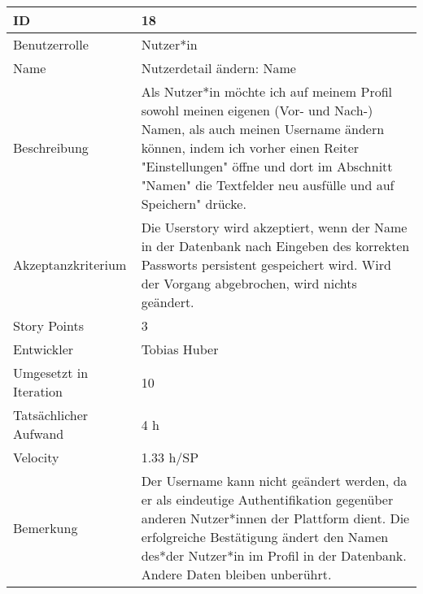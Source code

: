 \begin{tabularx}{\textwidth}{|p{}|X|}
	\hline
	ID & 18\\
	\hline
	Benutzerrolle & Nutzer*in\\
	\hline
	Name & Nutzerdetail ändern: Name\\
	\hline
	Beschreibung & Als Nutzer*in möchte ich auf meinem Profil sowohl meinen eigenen (Vor- und Nach-) Namen, als auch meinen Username ändern können, indem ich vorher einen Reiter "Einstellungen" öffne und dort im Abschnitt "Namen" die Textfelder neu ausfülle und auf Speichern" drücke.\\
	\hline
	Akzeptanzkriterium & Die Userstory wird akzeptiert, wenn der Name in der Datenbank nach Eingeben des korrekten Passworts persistent gespeichert wird. Wird der Vorgang abgebrochen, wird nichts geändert.\\
	\hline
	Story Points & 3\\
	\hline
	Entwickler & Tobias Huber\\
	\hline
	Umgesetzt in Iteration & 10\\
	\hline
	Tatsächlicher Aufwand & 4 h\\
	\hline
	Velocity & 1.33 h/SP\\
	\hline
	Bemerkung & Der Username kann nicht geändert werden, da er als eindeutige Authentifikation gegenüber anderen Nutzer*innen der Plattform dient. Die erfolgreiche Bestätigung ändert den Namen des*der Nutzer*in im Profil in der Datenbank. Andere Daten bleiben unberührt.\\
	\hline
\end{tabularx}
\vspace{20pt}
